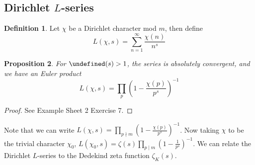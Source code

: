 \documentclass[11pt]{article}
\theoremstyle{definition}
\newtheorem{definition}{Definition}[section]
\theoremstyle{plain}
\newtheorem{proposition}[definition]{Proposition}
\theoremstyle{remark}
\let\Re\undefined
\DeclareMathOperator{\Re}{Re}
\begin{document}
\subsection{Dirichlet \texorpdfstring{$L$}{L}-series}

\begin{definition}\label{def:7_15}
    Let $\chi$ be a Dirichlet character mod $m$, then define
    \begin{equation*}
        L(\chi, s) = \sum_{n=1}^\infty \frac{\chi(n)}{n^s}
    \end{equation*}
\end{definition}

\begin{proposition}\label{prop:7_16}
    For $\Re(s) > 1$, the series is absolutely convergent, and we have an Euler product
    \begin{equation*}
        L(\chi, s) = \prod_p \left(1 - \frac{\chi(p)}{p^s}\right)^{-1}
    \end{equation*}
\end{proposition}
\begin{proof}
    See Example Sheet 2 Exercise 7.
\end{proof}

Note that we can write $L(\chi,s) = \prod_{p \nmid m} \left(1 - \frac{\chi(p)}{p^s}\right)^{-1}$. Now taking $\chi$ to be the trivial character $\chi_0$, $L(\chi_0,s) = \zeta(s) \prod_{p \mid m} \left(1 - \frac{1}{p^s}\right)^{-1}$. We can relate the Dirichlet $L$-series to the Dedekind zeta function $\zeta_K(s)$.
\end{document}
